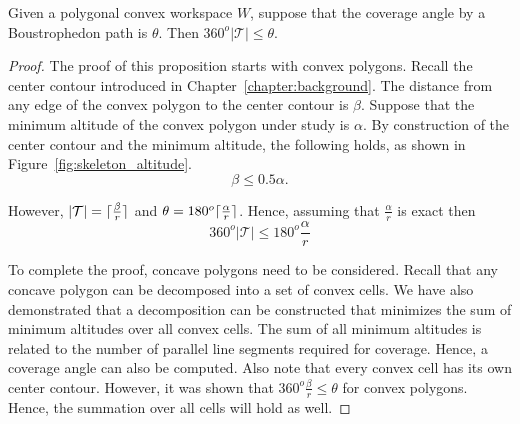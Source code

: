 \documentclass[../main.tex]{subfiles}
\begin{document}
\begin{proposition}
	Given a polygonal convex workspace $W$, suppose that the coverage angle by a Boustrophedon path is $\theta$. Then $360^o|\mathcal{T}|\leq\theta$.
\end{proposition}
\begin{proof}

The proof of this proposition starts with convex polygons. Recall the center contour introduced in Chapter~\ref{chapter:background}. The distance from any edge of the convex polygon to the center contour is $\beta$. Suppose that the minimum altitude of the convex polygon under study is $\alpha$. By construction of the center contour and the minimum altitude, the following holds, as shown in Figure~\ref{fig:skeleton_altitude}.
\begin{equation}
	\beta\leq 0.5\alpha.
\end{equation}

However, $|\mathcal{T}|=\lceil\frac{\beta}{r}\rceil$ and $\theta=180^o\lceil\frac{\alpha}{r}\rceil$. Hence, assuming that $\frac{\alpha}{r}$ is exact then
\begin{equation}
 360^o|\mathcal{T}|\leq180^o\frac{\alpha}{r}
 \end{equation}

To complete the proof, concave polygons need to be considered. Recall that any concave polygon can be decomposed into a set of convex cells. We have also demonstrated that a decomposition can be constructed that minimizes the sum of minimum altitudes over all convex cells. The sum of all minimum altitudes is related to the number of parallel line segments required for coverage. Hence, a coverage angle can also be computed. Also note that every convex cell has its own center contour. However, it was shown that $360^o\frac{\beta}{r}\leq\theta$ for convex polygons. Hence, the summation over all cells will hold as well.
\end{proof}


\end{document}
